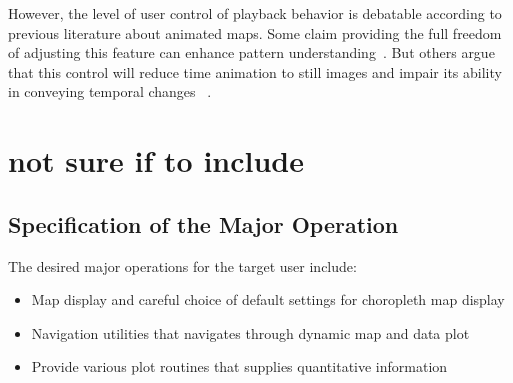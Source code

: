 \begin{comment}

``Data Visualization with Spacetime Maps'', Richard L. Brownrigg, 2005
(read further later on)

\grey{To be continued later:
\begin{enumerate}[label*=\arabic*.]
\item ``Geographic Visualization: Designing Manipulable Maps for
    Exploring Temporally Varying Georeferenced Statistics'', MacEachren et al.\
\item ``Strategies for the Visualization of Geographic Time-Series
    Data'', Mark Monmonier, 2011
\item ``Evaluation of Methods for Classifying Epidemiological Data
    on Choropleth Maps in Series'', Brewer and Pickle, 2002
\end{enumerate}}
\end{comment}



However, the level of user control of playback behavior is debatable
according to previous literature about animated maps. Some claim
providing the full freedom of adjusting this feature can enhance
pattern understanding~\cite{Nelson1998}. But others argue that this
control will reduce time animation to still images and impair its
ability in conveying temporal changes ~\cite{Lowe2004}.



\section{not sure if to include}

\subsection{Specification of the Major Operation}
The desired major operations for the target user include: 
\begin{itemize}
\item Map display and careful choice of default settings for
  choropleth map display
\item Navigation utilities that navigates through dynamic map and data
  plot
\item Provide various plot routines that supplies quantitative
  information
\end{itemize}

